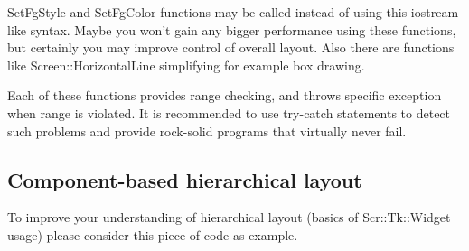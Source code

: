 SetFgStyle and SetFgColor functions may be called instead of using
this iostream-like syntax. Maybe you won't gain any bigger performance
using these functions, but certainly you may improve control of
overall layout. Also there are functions like Screen::HorizontalLine
simplifying for example box drawing. 

\important
Each of these  functions provides range checking, and throws specific
exception when range is violated. It is recommended to use try-catch
statements to detect such problems and provide rock-solid programs that
virtually never fail. 


\vspace{\fill}
\pagebreak


\subsection {Component-based hierarchical layout}



To improve your understanding of hierarchical layout (basics of
Scr::Tk::Widget usage) please consider this piece of code as example.

\fullcode
